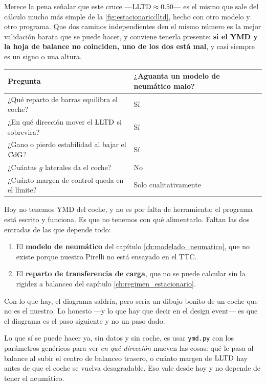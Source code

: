 Merece la pena señalar que este cruce ---$\mathrm{LLTD} \approx \num{0.50}$--- es el
mismo que sale del cálculo mucho más simple de la
\cref{fig:estacionario:lltd}, hecho con otro modelo y otro programa. Que dos
caminos independientes den el mismo número es la mejor validación barata que se
puede hacer, y conviene tenerla presente: \textbf{si el YMD y la hoja de
balance no coinciden, uno de los dos está mal}, y casi siempre es un signo o
una altura.

\begin{center}
\begin{tabularx}{\textwidth}{@{}Xl@{}}
\toprule
\textbf{Pregunta} & \textbf{¿Aguanta un modelo de neumático malo?} \\
\midrule
¿Qué reparto de barras equilibra el coche? & Sí \\
¿En qué dirección mover el $\mathrm{LLTD}$ si sobrevira? & Sí \\
¿Gano o pierdo estabilidad al bajar el $\mathrm{CdG}$? & Sí \\
¿Cuántas $g$ laterales da el coche? & No \\
¿Cuánto margen de control queda en el límite? & Solo cualitativamente \\
\bottomrule
\end{tabularx}
\end{center}


\begin{caso}
Hoy no tenemos YMD del coche, y no es por falta de herramienta: el programa
está escrito y funciona. Es que no tenemos con qué alimentarlo. Faltan las dos
entradas de las que depende todo:

\begin{enumerate}
  \item El \textbf{modelo de neumático} del capítulo
        \ref{ch:modelado_neumatico}, que no existe porque nuestro Pirelli no
        está ensayado en el TTC.
  \item El \textbf{reparto de transferencia de carga}, que no se puede calcular
        sin la rigidez a balanceo del capítulo \ref{ch:regimen_estacionario}.
\end{enumerate}

Con lo que hay, el diagrama saldría, pero sería un dibujo bonito de un coche
que no es el nuestro. Lo honesto ---y lo que hay que decir en el design
event--- es que el diagrama es el paso siguiente y no un paso dado.

\medskip
Lo que sí se puede hacer ya, sin datos y sin coche, es usar
\texttt{ymd.py} con los parámetros genéricos para ver \emph{en qué dirección}
mueven las cosas: qué le pasa al balance al subir el centro de balanceo
trasero, o cuánto margen de $\mathrm{LLTD}$ hay antes de que el coche se vuelva
desagradable. Eso vale desde hoy y no depende de tener el neumático.

\medskip
{}
\end{caso}

